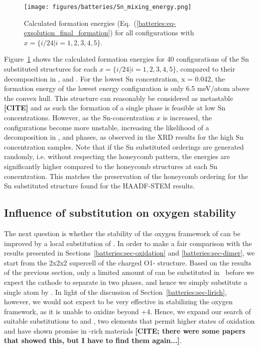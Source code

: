 \begin{refsection}
\begin{figure}[h] 
\centering 
\texttt{[image: figures/batteries/Sn\_mixing\_energy.png]} 
\caption{Calculated formation energies 
(Eq.~(\ref{batteries:eq-exsolution_final_formation}) for all configurations 
with $x = \{i/24|i=1,2,3,4,5\}$.} 
\label{batteries:fig-Sn_mixing} 
\end{figure} 
 
Figure~\ref{batteries:fig-Sn_mixing} shows the calculated formation energies 
for 40 configurations of the Sn substituted structures for each $x = 
\{i/24|i=1,2,3,4,5\}$, compared to their decomposition in 
,  and . For the lowest Sn 
concentration, x = 0.042, the formation energy of the lowest energy 
configuration is only 6.5 meV/atom above the convex hull. This structure can 
reasonably be considered as metastable \textbf{[CITE]} and as such the 
formation of a single phase is feasible at low Sn concentrations. However, as 
the Sn-concentration $x$ is increased, the  
configurations become more unstable, increasing the likelihood of a 
decomposition in ,  and  phases, as 
observed in the XRD results for the high Sn concentration samples. Note that 
if the Sn substituted orderings are generated randomly, i.e. without 
respecting the honeycomb pattern, the energies are significantly higher 
compared to the honeycomb structures at each Sn concentration. This matches 
the preservation of the honeycomb ordering for the Sn substituted structure 
found for the HAADF-STEM results. 
 
\subsection{Influence of  substitution on oxygen stability} 
\label{batteries:sec-dimer_substitution} 
 
The next question is whether the stability of the oxygen framework of 
 can be improved by a local substitution of . In order 
to make a fair comparison with the results presented in 
Sections~\ref{batteries:sec-oxidation} and \ref{batteries:sec-dimer}, we start 
from the 2x2x2 supercell of the charged O1- structure. Based 
on the results of the previous section, only a limited amount of  can 
be substituted in~ before we expect the cathode to separate in two 
phases, and hence we simply substitute a single  atom by . In 
light of the discussion of Section~\ref{batteries:sec-lirich},  however, we 
would not expect  to be very effective in stabilizing the oxygen 
framework, as it is unable to oxidize beyond +4. Hence, we expand our search 
of suitable substitutions to  and , two elements that permit 
higher states of oxidation and have shown promise in -rich materials 
\textbf{[CITE; there were some papers that showed this, but I have to find 
them again...]}. 
 

\end{refsection}
